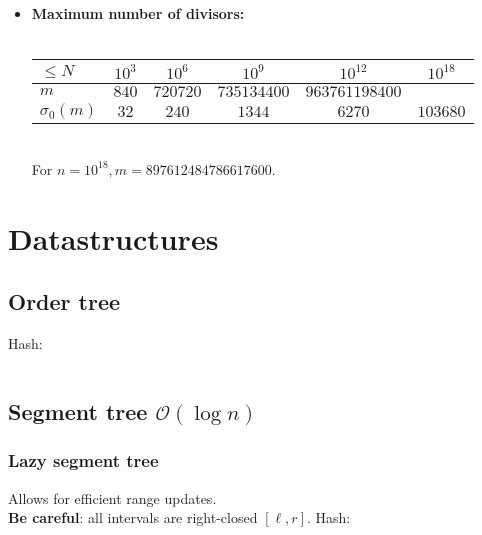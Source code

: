 \documentclass[9pt,a4paper,landscape,oneside]{amsart}
\newcommand{\mintedstyle}[2]{\inputminted{#1}{code/#2}}
\newcommand{\code}[1]{ Hash: 
\mintedstyle{cpp}{#1}}
\newenvironment{myitemize}
{\begin{itemize}[leftmargin=.3cm]
	\setlength{\itemsep}{0pt}
	\setlength{\parskip}{0pt}
	\setlength{\parsep}{0pt}     }
{ \end{itemize}                  }
\begin{document}
\begin{multicols*}{3}
\begin{myitemize}
\item \textbf{Maximum number of divisors:} \\
\\
	\begin{tabular}{|l|ccccc|}
   \hline
   $\leq N$ & $10^3$ & $10^6$ & $10^9$ & $10^{12}$ & $10^{18}$ \\
   \hline
   $m$ & $840$ & $720720$ & $735134400$ & $963761198400$ & \\
   \hline
   $\sigma_0(m)$ & $32$ & $240$ & $1344$ & $6270$ & $103680$ \\
   \hline
   \end{tabular}\\
   For $n = 10^{18}, m = 897612484786617600$.

\end{myitemize}

\section{Datastructures}
\subsection{Order tree}
\code{datastructures/order_statistic.cc}

\subsection{Segment tree $\mathcal{O}(\log n)$}


\subsubsection{Lazy segment tree} Allows for efficient range updates.~\\

\textbf{Be careful}: all intervals are right-closed $[\ell,r]$.
\code{datastructures/lazy_segment_tree.cpp}


\end{multicols*}
\end{document}
